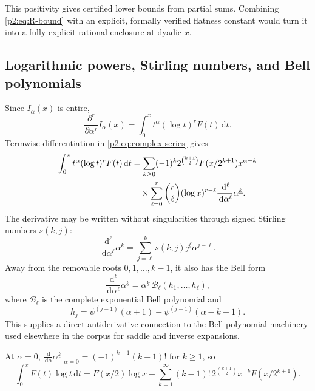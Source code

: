 \documentclass[11pt,oneside]{article}
\theoremstyle{definition}
\theoremstyle{remark}
\newcommand{\dd}{\,\mathrm d}
\newcommand{\fall}[2]{#1^{\underline{#2}}}
\newcommand{\1}{\mathbf 1}
\begin{document}
This positivity gives certified lower bounds from partial sums.  Combining
\eqref{p2:eq:R-bound} with an explicit, formally verified flatness constant
would turn it into a fully explicit rational enclosure at dyadic $x$.

\subsection{Logarithmic powers, Stirling numbers, and Bell polynomials}
Since $I_\alpha(x)$ is entire,
\begin{equation}
 \frac{\partial^r}{\partial\alpha^r}I_\alpha(x)
 =\int_0^xt^\alpha(\log t)^rF(t)\dd t.                    \label{p2:eq:log-derivative}
\end{equation}
Termwise differentiation in \eqref{p2:eq:complex-series} gives
\begin{align}
 \int_0^xt^\alpha(\log t)^rF(t)\dd t
 &=\sum_{k\ge0}(-1)^k2^{\binom{k+1}{2}}F(x/2^{k+1})x^{\alpha-k} \notag\\
 &\quad\times\sum_{\ell=0}^{r}\binom r\ell
 (\log x)^{r-\ell}\frac{\dd^\ell}{\dd\alpha^\ell}
 \fall{\alpha}{k}.                                       \label{p2:eq:log-series}
\end{align}
The derivative may be written without singularities through signed Stirling
numbers $s(k,j)$:
\begin{equation}
 \frac{\dd^\ell}{\dd\alpha^\ell}\fall{\alpha}{k}
 =\sum_{j=\ell}^{k}s(k,j)\fall{j}{\ell}\alpha^{j-\ell}.  \label{p2:eq:stirling-derivative}
\end{equation}
Away from the removable roots $0,1,\ldots,k-1$, it also has the Bell form
\begin{equation}
 \frac{\dd^\ell}{\dd\alpha^\ell}\fall{\alpha}{k}
 =\fall{\alpha}{k}\,
 \mathcal B_\ell(h_1,\ldots,h_\ell),                     \label{p2:eq:bell-derivative}
\end{equation}
where $\mathcal B_\ell$ is the complete exponential Bell polynomial and
\begin{equation}
 h_j=\psi^{(j-1)}(\alpha+1)-\psi^{(j-1)}(\alpha-k+1).      \label{p2:eq:bell-h}
\end{equation}
This supplies a direct antiderivative connection to the Bell-polynomial
machinery used elsewhere in the corpus for saddle and inverse expansions.

At $\alpha=0$, $\frac{\dd}{\dd\alpha}\fall{\alpha}{k}|_{\alpha=0}
=(-1)^{k-1}(k-1)!$ for $k\ge1$, so
\begin{equation}
 \boxed{
 \int_0^xF(t)\log t\dd t
 =F(x/2)\log x-
 \sum_{k=1}^{\infty}(k-1)!\,2^{\binom{k+1}{2}}
 x^{-k}F(x/2^{k+1}).}                                     \label{p2:eq:log-explicit}
\end{equation}
\end{document}
